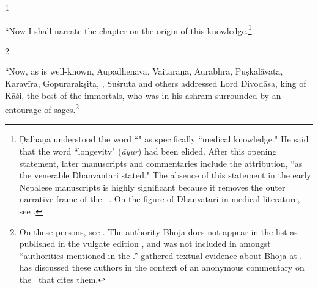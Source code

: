 \begin{translation}
    
    \item[1] 
    
“Now I shall narrate the chapter on the origin of this
knowledge.\footnote{Ḍalhaṇa understood the word
    “" as specifically  “medical knowledge." He
    said that the word  “longevity" (\emph{āyur})  had been elided. %
    After this opening statement, later manuscripts and commentaries
    include the attribution,  “as the venerable Dhanvantari stated." 
    The absence of this statement in the early Nepalese manuscripts
    is highly significant because it removes the outer narrative
    frame of the \SS\
    \parencites[148]{wuja-2013}[\S\,3.1.2]{kleb-2021b}{rai-2019}{birc-2021}.  
    On the figure of Dhanvatari in medical literature, see \cite[IA 
    358--361]{meul-hist}.} %
    
    \item[2] 
    
“Now, as is well-known, Aupadhenava, Vaitaraṇa, Aurabhra,
Puṣkalāvata, Karavīra, Gopurarakṣita, , Suśruta and
others addressed Lord Divodāsa, king of Kāśi, the best of the
immortals, who was in his ashram surrounded by an entourage of
sages.\footnote{On these persons, see \cite[IA 361--363,
    369\,ff.]{meul-hist}. \label{Bhoja}
    The authority Bhoja does not appear in the list
    as published in the vulgate edition \citep[1]{susr-trikamji2}, and
    was not included in \cite{meul-hist} amongst “authorities mentioned
    in the \SS.” \citeauthor{meul-hist} gathered textual evidence about
    Bhoja at \cite[IA 690--691]{meul-hist}. \citet{kleb-2021a} has
    discussed these authors in the context of an anonymous commentary on
    the \SS\ that cites them.}
    
    \nocite{emen-1969}
    
    

\end{translation}
